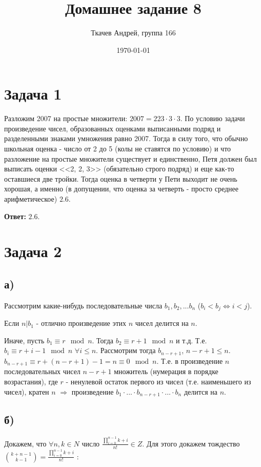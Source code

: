 \documentclass{article}
\title{Домашнее задание 8}
\author{Ткачев Андрей, группа 166}
\date{\today}
\begin{document}
	\maketitle
	\section {Задача 1}
	Разложим 2007 на простые множители: $2007 = 223 \cdot 3 \cdot 3$. По условию задачи произведение чисел, образованных оценками выписанными подряд и разделенными знаками умножения равно 2007. Тогда в силу того, что обычно школьная оценка - число от 2 до 5 (колы не ставятся по условию) и что разложение на простые множители существует и единственно, Петя должен был выписать оценки <<2, 2, 3>> (обязательно строго подряд) и еще как-то оставшиеся две тройки. Тогда оценка в четверти у Пети выходит не очень хорошая, а именно (в допущении, что оценка за четверть - просто среднее арифметическое) $2.6$.
	
	\textbf{Ответ:} $2.6$.
	
	\section {Задача 2}
	
	\subsection {а)} Рассмотрим какие-нибудь последовательные числа $b_1, b_2, ... b_n$ ($b_i < b_j \Leftrightarrow i < j$). 
	
	Если $n | b_1$ - отлично произведение этих $n$ чисел делится на $n$.
	
	 Иначе, пусть $b_1 \equiv r \mod n$. Тогда $b_2 \equiv r + 1 \mod n$ и т.д. Т.е. $b_i \equiv r + i - 1 \mod n$ $\forall i \leqslant n$. Рассмотрим тогда $b_{n - r + 1}$, $n - r + 1 \leqslant n$.
	 $b_{n - r + 1} \equiv r + (n - r + 1) - 1 = n \equiv 0 \mod n$. Т.е. в произведение $n$ последовательных чисел $n - r + 1$ множитель (нумерация в порядке возрастания), где $r$ - ненулевой остаток первого из чисел (т.е. наименьшего из чисел), кратен $n$ $\Rightarrow$ произведение $b_1 \cdot ... \cdot b_{n - r + 1}  \cdot ... \cdot b_n$ делится на $n$.
	 
	 \subsection {б)} Докажем, что $\forall n, k\in N$ число $\frac{\prod_{i=0}^{n - 1} k + i}{n!} \in Z$.
	 Для этого докажем тождество $ {k + n - 1 \choose k - 1} =  \frac{\prod_{i=0}^{n - 1} k + i}{n!}$ :
	 
\end{document}
